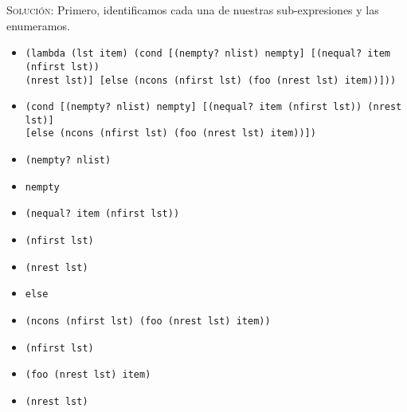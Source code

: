 \documentclass[letterpaper,11pt]{article}
\begin{document}
\begin{enumerate}
    \textsc{Solución:} Primero, identificamos cada una de nuestras 
    sub-expresiones y las enumeramos.
    \begin{itemize}
        \item {} \texttt{(lambda (lst item) (cond [(nempty? nlist) nempty]
        [(nequal? item (nfirst lst))} \\ 
        \texttt{(nrest lst)] [else (ncons (nfirst lst) (foo (nrest lst) item))]))}

        \item {} \texttt{(cond [(nempty? nlist) nempty] [(nequal? item 
        (nfirst lst)) (nrest lst)]} \\ 
        \texttt{[else (ncons (nfirst lst) (foo (nrest lst) item))])}

        \item {} \texttt{(nempty? nlist)}

        \item {} \texttt{nempty}
        
        \item {} \texttt{(nequal? item (nfirst lst))}

        \item {} \texttt{(nfirst lst)}
        
        \item {} \texttt{(nrest lst)}
        
        \item {} \texttt{else}
        
        \item {} \texttt{(ncons (nfirst lst) (foo (nrest lst) item))}

        \item {} \texttt{(nfirst lst)}

        \item {} \texttt{(foo (nrest lst) item)}

        \item {} \texttt{(nrest lst)}
    \end{itemize}


\end{enumerate}
\end{document}
